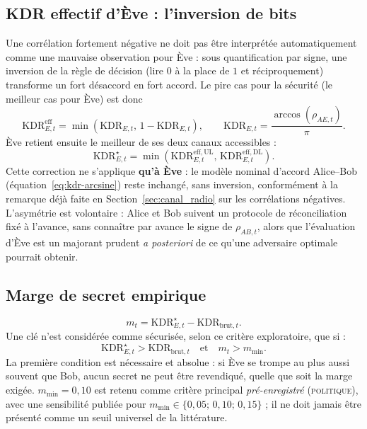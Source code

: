 \documentclass[conference,a4paper]{IEEEtran}
\newcommand{\statusPol}{\textsc{politique}}
\newcommand{\KDR}{\mathrm{KDR}}
\begin{document}
\subsection{KDR effectif d'Ève : l'inversion de bits}
Une corrélation fortement négative ne doit pas être interprétée automatiquement comme une mauvaise observation pour Ève : sous quantification par signe, une inversion de la règle de décision (lire $0$ à la place de $1$ et réciproquement) transforme un fort désaccord en fort accord. Le pire cas pour la sécurité (le meilleur cas pour Ève) est donc
\begin{equation}
    \KDR_{E,t}^{\mathrm{eff}}=\min\!\left(\KDR_{E,t},\,1-\KDR_{E,t}\right),
    \qquad \KDR_{E,t}=\frac{\arccos(\rho_{AE,t})}{\pi}.
    \label{eq:eve-kdr-effective}
\end{equation}
Ève retient ensuite le meilleur de ses deux canaux accessibles :
\begin{equation}
    \KDR_{E,t}^{\star}=\min\!\left(\KDR_{E,t}^{\mathrm{eff},\mathrm{UL}},\,\KDR_{E,t}^{\mathrm{eff},\mathrm{DL}}\right).
    \label{eq:eve-kdr-best}
\end{equation}
Cette correction ne s'applique \textbf{qu'à Ève} : le modèle nominal d'accord Alice--Bob (équation~\eqref{eq:kdr-arcsine}) reste inchangé, sans inversion, conformément à la remarque déjà faite en Section~\ref{sec:canal_radio} sur les corrélations négatives. L'asymétrie est volontaire : Alice et Bob suivent un protocole de réconciliation fixé à l'avance, sans connaître par avance le signe de $\rho_{AB,t}$, alors que l'évaluation d'Ève est un majorant prudent \emph{a posteriori} de ce qu'une adversaire optimale pourrait obtenir.

\subsection{Marge de secret empirique}
\begin{equation}
    m_t=\KDR_{E,t}^{\star}-\KDR_{\mathrm{brut},t}.
    \label{eq:eve-margin}
\end{equation}
Une clé n'est considérée comme sécurisée, selon ce critère exploratoire, que si :
\begin{equation}
    \KDR_{E,t}^{\star}>\KDR_{\mathrm{brut},t}
    \quad\text{et}\quad
    m_t>m_{\min}.
    \label{eq:eve-secure}
\end{equation}
La première condition est nécessaire et absolue : si Ève se trompe au plus aussi souvent que Bob, aucun secret ne peut être revendiqué, quelle que soit la marge exigée. $m_{\min}=0{,}10$ est retenu comme critère principal \emph{pré-enregistré} (\statusPol{}), avec une sensibilité publiée pour $m_{\min}\in\{0{,}05;\,0{,}10;\,0{,}15\}$ ; il ne doit jamais être présenté comme un seuil universel de la littérature.
\end{document}
